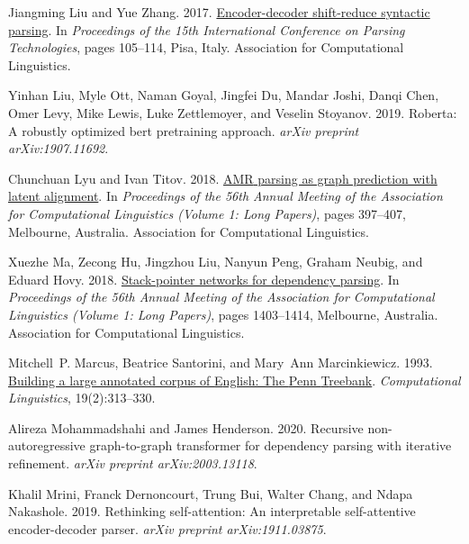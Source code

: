 \documentclass[11pt,a4paper]{article}
\begin{document}
\begin{thebibliography}{34}
Jiangming Liu and Yue Zhang. 2017.
\newblock \href {https://www.aclweb.org/anthology/W17-6315} {Encoder-decoder
  shift-reduce syntactic parsing}.
\newblock In \emph{Proceedings of the 15th International Conference on Parsing
  Technologies}, pages 105--114, Pisa, Italy. Association for Computational
  Linguistics.

Yinhan Liu, Myle Ott, Naman Goyal, Jingfei Du, Mandar Joshi, Danqi Chen, Omer
  Levy, Mike Lewis, Luke Zettlemoyer, and Veselin Stoyanov. 2019.
\newblock Roberta: A robustly optimized bert pretraining approach.
\newblock \emph{arXiv preprint arXiv:1907.11692}.

Chunchuan Lyu and Ivan Titov. 2018.
\newblock \href {https://doi.org/10.18653/v1/P18-1037} {{AMR} parsing as graph
  prediction with latent alignment}.
\newblock In \emph{Proceedings of the 56th Annual Meeting of the Association
  for Computational Linguistics (Volume 1: Long Papers)}, pages 397--407,
  Melbourne, Australia. Association for Computational Linguistics.

Xuezhe Ma, Zecong Hu, Jingzhou Liu, Nanyun Peng, Graham Neubig, and Eduard
  Hovy. 2018.
\newblock \href {https://doi.org/10.18653/v1/P18-1130} {Stack-pointer networks
  for dependency parsing}.
\newblock In \emph{Proceedings of the 56th Annual Meeting of the Association
  for Computational Linguistics (Volume 1: Long Papers)}, pages 1403--1414,
  Melbourne, Australia. Association for Computational Linguistics.

Mitchell~P. Marcus, Beatrice Santorini, and Mary~Ann Marcinkiewicz. 1993.
\newblock \href {https://www.aclweb.org/anthology/J93-2004} {Building a large
  annotated corpus of {E}nglish: The {P}enn {T}reebank}.
\newblock \emph{Computational Linguistics}, 19(2):313--330.

Alireza Mohammadshahi and James Henderson. 2020.
\newblock Recursive non-autoregressive graph-to-graph transformer for
  dependency parsing with iterative refinement.
\newblock \emph{arXiv preprint arXiv:2003.13118}.

Khalil Mrini, Franck Dernoncourt, Trung Bui, Walter Chang, and Ndapa Nakashole.
  2019.
\newblock Rethinking self-attention: An interpretable self-attentive
  encoder-decoder parser.
\newblock \emph{arXiv preprint arXiv:1911.03875}.


\end{thebibliography}
\end{document}
